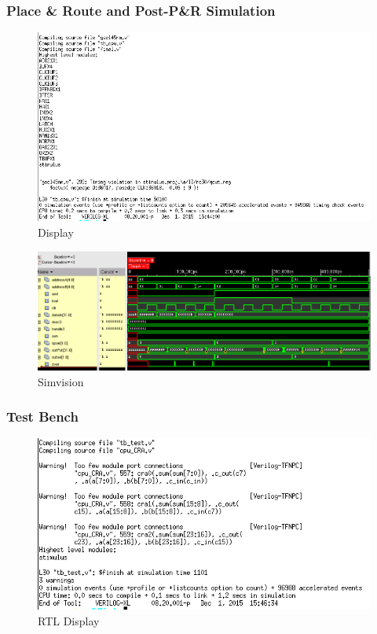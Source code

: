 \documentclass[12pt]{article}
\begin{document}
\subsubsection{Place \& Route and Post-P\&R Simulation}
\begin{figure}[H]
\centering
\includegraphics[width=1\linewidth]{../CRA/encounter-text}
\caption{Display}
\label{fig:encounter-text}
\end{figure}
\begin{figure}[H]
\centering
\includegraphics[width=1\linewidth]{../CRA/encounter-test}
\caption{Simvision}
\label{fig:encounter-test}
\end{figure}

\subsubsection{Test Bench}
\begin{figure}[H]
\centering
\includegraphics[width=1\linewidth]{../CRA/test-text}
\caption{RTL Display}
\label{fig:test-text}
\end{figure}
\end{document}
